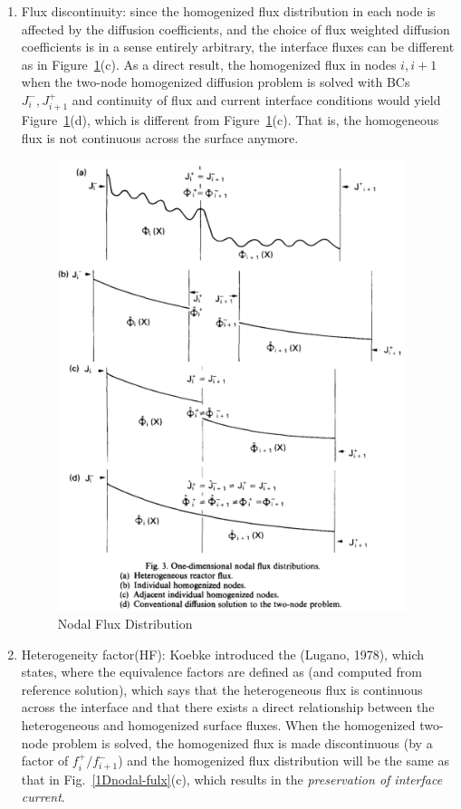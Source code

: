 \documentclass{school-22.211-notes}
\begin{document}
\begin{enumerate}
\item Flux discontinuity: since the homogenized flux distribution in each node is affected by the diffusion coefficients, and the choice of flux weighted diffusion coefficients is in a sense entirely arbitrary, the interface fluxes can be different as in Figure~\ref{1Dnodal-flux}(c). As a direct result, the homogenized flux in nodes $i, i+1$ when the two-node homogenized diffusion problem is solved with BCs $J_i^-, J_{i+1}^+$ and continuity of flux and current interface conditions would yield Figure~\ref{1Dnodal-flux}(d), which is different from Figure~\ref{1Dnodal-flux}(c). That is, the homogeneous flux is not continuous across the surface anymore. 
\begin{figure}[ht]
  \centering
  \includegraphics[width=4in]{images/methd/1Dnodal-flux.png}
  \caption{Nodal Flux Distribution} \label{1Dnodal-flux}
\end{figure}

\item Heterogeneity factor(HF): Koebke introduced the (Lugano, 1978), which states,
where the equivalence factors are defined as (and computed from reference solution), 
which says that the heterogeneous flux is continuous across the interface and that there exists a direct relationship between the heterogeneous and homogenized surface fluxes. When the homogenized two-node problem is solved, the homogenized flux is made discontinuous (by a factor of $f_i^+/f_{i+1}^-$) and the homogenized flux distribution will be the same as that in Fig.~\ref{1Dnodal-fulx}(c), which results in the \textit{preservation of interface current}. 


\end{enumerate}
\end{document}
